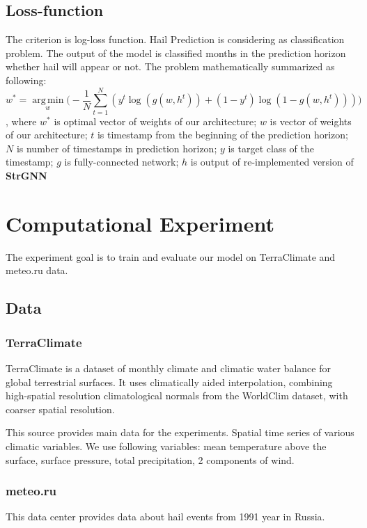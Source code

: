 \documentclass{article}
\DeclareMathOperator*{\argmin}{arg\,min}
\begin{document}
\subsection{Loss-function}
The criterion is  log-loss function. Hail Prediction is considering as classification problem. The output of the model is classified months in the prediction horizon whether hail will appear or not.
The problem mathematically summarized as following:
\begin{equation}
    w^* = \argmin\limits_w \Big ( - \frac{1}{N}\sum\limits_{t = 1 }^{N}(y ^ t \log(g(w, h^t)) + (1 - y ^ t)\log(1 - g(w, h^t)))\Big )
\end{equation}
, where  $w^*$ is optimal vector of weights of our architecture; $w$ is vector of weights of our architecture; $t$ is timestamp from the beginning of the prediction horizon; $N$ is number of timestamps in prediction horizon; $y$ is target class of the timestamp; $g$ is fully-connected network; $h$ is output of re-implemented version of \textbf{StrGNN}~\cite{DBLP:journals/corr/abs-2005-07427}\\


\section{Computational Experiment}
The experiment goal is to train and evaluate our model on TerraClimate and meteo.ru data.
\subsection{Data}
\subsubsection{TerraClimate}
TerraClimate is a dataset of monthly climate and climatic water balance for global terrestrial surfaces. It uses climatically aided interpolation, combining high-spatial resolution climatological normals from the WorldClim dataset, with coarser spatial resolution.

This source provides main data for the experiments. Spatial time series of various 
climatic variables. We use following variables: mean temperature above the surface, surface pressure, total precipitation, 2 components of wind.
\subsubsection{meteo.ru}
This data center provides data about hail events from 1991 year in Russia.
\end{document}
